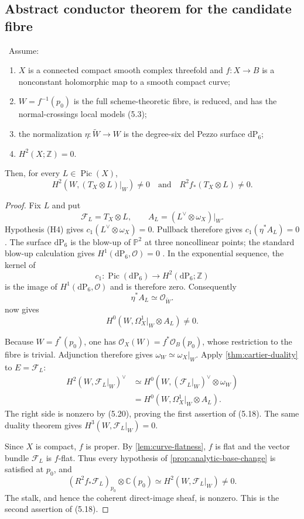\subsection{Abstract conductor theorem for the candidate fibre}

\begin{theorem}
\label{thm:candidate-conductor}
\Verified\ Assume:
\begin{enumerate}[label=(H\arabic*)]
\item $X$ is a connected compact smooth complex threefold and
$f:X\to B$ is a nonconstant holomorphic map to a smooth compact curve;
\item $W=f^{-1}(p_0)$ is the full scheme-theoretic fibre, is reduced, and
has the normal-crossings local models (5.3);
\item the normalization $\eta:\widetilde W\to W$ is the degree-six del
Pezzo surface $\mathrm{dP}_6$;
\item $H^2(X;\mathbb Z)=0$.
\end{enumerate}
Then, for every $L\in\operatorname{Pic}(X)$,
\[
H^2(W,(T_X\otimes L)|_W)\ne0
\quad\text{and}\quad
R^2f_*(T_X\otimes L)\ne0.
\tag{5.18}
\]
\end{theorem}

\begin{proof}
Fix $L$ and put
\[
\mathcal F_L=T_X\otimes L,\qquad
A_L=(L^\vee\otimes\omega_X)|_W.
\]
Hypothesis (H4) gives $c_1(L^\vee\otimes\omega_X)=0$.  Pullback therefore
gives $c_1(\eta^*A_L)=0$.  The surface $\mathrm{dP}_6$ is the blow-up of
$\mathbb P^2$ at three noncollinear points; the standard blow-up calculation
gives $H^1(\mathrm{dP}_6,\mathcal O)=0$
\cite[Chapter~V]{Hartshorne1977}.  In the exponential sequence, the kernel
of
\[
c_1:\operatorname{Pic}(\mathrm{dP}_6)\longrightarrow
H^2(\mathrm{dP}_6;\mathbb Z)
\]
is the image of $H^1(\mathrm{dP}_6,\mathcal O)$ and is therefore zero.
Consequently
\[
\eta^*A_L\simeq\mathcal O_{\widetilde W}.
\tag{5.19}
\]
 now gives
\[
H^0(W,\Omega^1_X|_W\otimes A_L)\ne0.
\tag{5.20}
\]

Because $W=f^*(p_0)$, one has
$\mathcal O_X(W)=f^*\mathcal O_B(p_0)$, whose restriction to the fibre is
trivial.  Adjunction therefore gives $\omega_W\simeq\omega_X|_W$.
Apply \cref{thm:cartier-duality} to $E=\mathcal F_L$:
\[
\begin{split}
H^2(W,\mathcal F_L|_W)^\vee
&\simeq H^0(W,(\mathcal F_L|_W)^\vee\otimes\omega_W)\\
&=H^0(W,\Omega^1_X|_W\otimes A_L).
\end{split}
\]
The right side is nonzero by (5.20), proving the first assertion of (5.18).
The same duality theorem gives
$H^3(W,\mathcal F_L|_W)=0$.

Since $X$ is compact, $f$ is proper.  By
\cref{lem:curve-flatness}, $f$ is flat and the vector bundle
$\mathcal F_L$ is $f$-flat.  Thus every hypothesis of
\cref{prop:analytic-base-change} is satisfied at $p_0$, and
\[
(R^2f_*\mathcal F_L)_{p_0}\otimes\mathbb C(p_0)
\simeq H^2(W,\mathcal F_L|_W)\ne0.
\]
The stalk, and hence the coherent direct-image sheaf, is nonzero.  This is
the second assertion of (5.18).
\end{proof}


